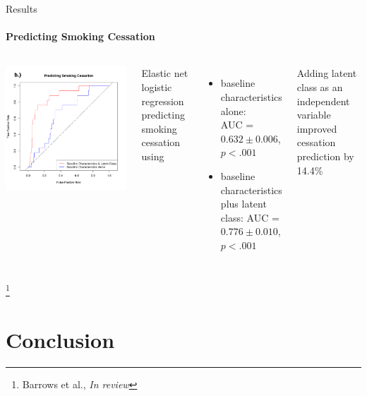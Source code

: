 \documentclass[aspectratio=169]{beamer}
\newcommand\blfootnote[1]{%
	\begingroup
	\renewcommand\thefootnote{}\footnote{#1}%
	\addtocounter{footnote}{-1}%
	\endgroup
}
\newcommand{\reviewcite}{\blfootnote{\tiny Barrows et al., \textit{In review}}}
\begin{document}
\begin{frame}{Results}
		\framesubtitle{Predicting Smoking Cessation}
		\begin{columns}
			\includegraphics[width=\columnwidth]{quit_roc}
				
				 Elastic net logistic regression predicting smoking cessation using
				\begin{itemize}
					\scriptsize
					\item baseline characteristics alone: \\ AUC = $0.632 \pm 0.006$, $p<.001$
					\item baseline characteristics plus latent class: AUC = $0.776 \pm 0.010$, $p<.001$
				\end{itemize}
				\begin{block}{}
					Adding latent class as an independent variable improved cessation prediction by 14.4\%
				\end{block}
		\end{columns}
		\reviewcite
\end{frame}



\section{Conclusion}
\end{document}
